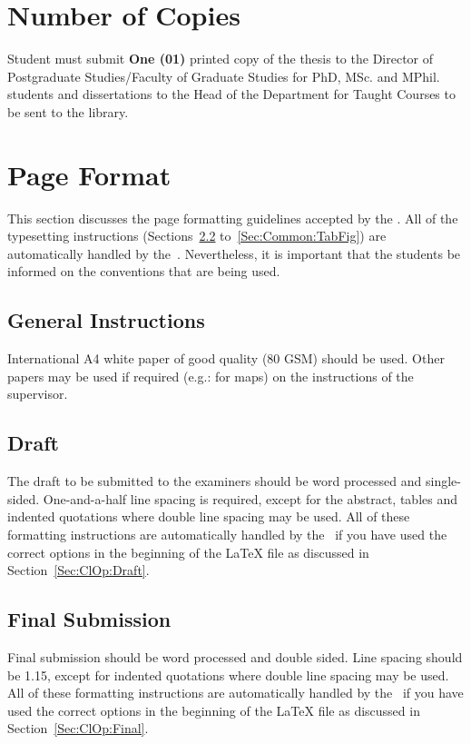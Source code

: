 \documentclass[12pt]{uomthesis}
\begin{document}
\section{Number of Copies}
Student must submit \textbf{One (01)} printed copy of the thesis to the Director of Postgraduate Studies/Faculty of Graduate Studies for PhD, MSc. and MPhil. students and dissertations to the Head of the Department for Taught Courses to be sent to the library. 

\section{Page Format}

This section discusses the page formatting guidelines accepted by the \UoM. All of the typesetting instructions (Sections~\ref{Sec:Draft} to~\ref{Sec:Common:TabFig}) are automatically handled by the~\TheClass. Nevertheless, it is important that the students be informed on the conventions that are being used. 

\subsection{General Instructions}
International A4 white paper of good quality (80 GSM) should be used. Other papers may be used if required (e.g.: for maps) on the instructions of the supervisor. 

\subsection{Draft}
\label{Sec:Draft}
The draft to be submitted to the examiners should be word
processed and single-sided. One-and-a-half line spacing is required, except for the abstract, tables and indented quotations where double line spacing may be used. All of these formatting instructions are automatically handled by the~\TheClass{} if you have used the correct options in the beginning of the \LaTeX{} file as discussed in Section~\ref{Sec:ClOp:Draft}.

\subsection{Final Submission}
\label{Sec:Final}
Final submission should be word processed and double
sided. Line spacing should be 1.15, except for indented quotations where double line spacing may be used. All of these formatting instructions are automatically handled by the~\TheClass{} if you have used the correct options in the beginning of the \LaTeX{} file as discussed in Section~\ref{Sec:ClOp:Final}.
\end{document}
